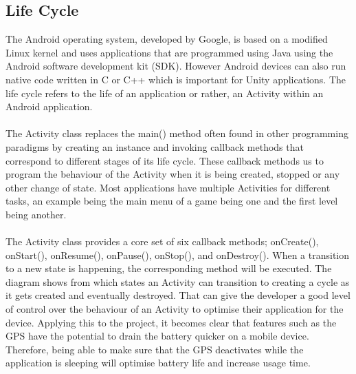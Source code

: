 \documentclass[a4paper]{report}
\begin{document}
\subsection{Life Cycle}
The Android operating system, developed by Google, is based on a modified Linux kernel and uses applications that are programmed using Java using the Android software development kit (SDK). However Android devices can also run native code written in C or C++ which is important for Unity applications. The life cycle refers to the life of an application or rather, an Activity within an Android application. 
\\\\
The Activity class replaces the main() method often found in other programming paradigms by creating an instance and invoking callback methods that correspond to different stages of its life cycle. These callback methods us to program the behaviour of the Activity when it is being created, stopped or any other change of state. Most applications have multiple Activities for different tasks, an example being the main menu of a game being one and the first level being another. \cite{Android}
\\\\
The Activity class provides a core set of six callback methods; onCreate(), onStart(), onResume(), onPause(), onStop(), and onDestroy(). When a transition to a new state is happening, the corresponding method will be executed. The diagram shows from which states an Activity can transition to creating a cycle as it gets created and eventually destroyed. That can give the developer a good level of control over the behaviour of an Activity to optimise their application for the device. Applying this to the project, it becomes clear that features such as the GPS  have the potential to drain the battery quicker on a mobile device. Therefore, being able to make sure that the GPS deactivates while the application is sleeping will optimise battery life and increase usage time.
\pagebreak
\end{document}
